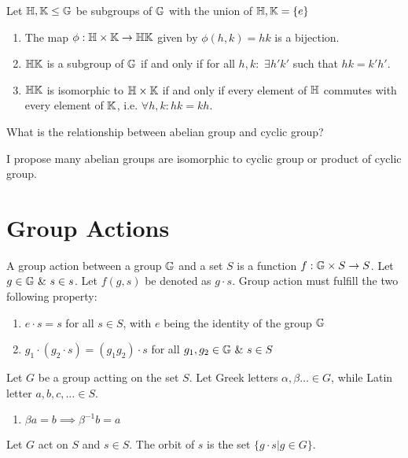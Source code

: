 \documentclass[../note.tex]{subfiles}
\begin{document}
\begin{theorem}
	Let $\mathbb{H}, \mathbb{K} \leq \mathbb{G}$ be subgroups of $\mathbb{G}$ with the union of $\mathbb{H}, \mathbb{K} = \{e\}$
	\begin{enumerate}
		\item The map $\phi: \mathbb{H}\times \mathbb{K} \rightarrow \mathbb{H}\mathbb{K}$ given by $\phi(h,k) = hk$ is a bijection.
		\item $\mathbb{H}\mathbb{K}$ is a subgroup of $\mathbb{G}$ if and only if for all $h, k: $ $\exists h' k'$ such that $hk = k'h'$.
		\item $\mathbb{H}\mathbb{K}$ is isomorphic to $\mathbb{H} \times \mathbb{K}$ if and only if every element of $\mathbb{H}$ commutes with every element of $\mathbb{K}$, i.e. $\forall h, k: hk=kh$.
	\end{enumerate}
\end{theorem}

\begin{hypothesis}
	What is the relationship between abelian group and cyclic group? 

	I propose many abelian groups are isomorphic to cyclic group or product of cyclic group.
\end{hypothesis}

\section{Group Actions}
\begin{definition}
	A group action between a group $\mathbb{G}$ and a set $S$ is a function $f: \mathbb{G}\times S \rightarrow S$. 
	Let $g\in \mathbb{G} \ \&\ s \in s$. Let $f(g,s)$ be denoted as $g\cdot s$. Group action must fulfill the two following property:
	\begin{enumerate}
		\item $e\cdot s=s$ for all $s\in S$, with $e$ being the identity of the group $\mathbb{G}$
		\item $g_1\cdot(g_2 \cdot s) = (g_1 g_2) \cdot s$ for all $g_1, g_2 \in \mathbb{G}\ \&\ s \in S$
	\end{enumerate}
\end{definition}

\begin{theorem}
	Let $G$ be a group actting on the set $S$. Let Greek letters $\alpha, \beta \dots \in G$, while Latin letter $a,b,c, \dots \in S$.
	\begin{enumerate}
		\item $\beta a = b \implies \beta^{-1} b = a$ 
	\end{enumerate}
\end{theorem}
\begin{definition}[Orbit]
	Let $G$ act on $S$ and $s \in S$. The orbit of $s$ is the set $\{g\cdot s | g \in G\}$.	
\end{definition}
\end{document}
